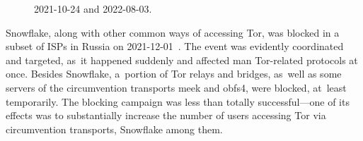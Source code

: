 \documentclass[letterpaper,twocolumn]{article}
\begin{document}
\begin{figure}
{\begin{minipage}[b][\textheight][b]{\linewidth}
{%
\mbox{2021-10-24} and \mbox{2022-08-03}.
\label{fig:client-counts-tm}
}
\end{minipage}}
\end{figure}


Snowflake, along with other common ways of accessing Tor,
was blocked in a subset of ISPs in Russia
on \mbox{2021-12-01}~\cite{ooni-2021-russia-blocks-tor}.
The event was evidently coordinated and targeted,
as~it happened suddenly and affected man Tor-related protocols at once.
Besides Snowflake,
a~portion of Tor relays and bridges,
as~well as some servers of
the circumvention transports meek and obfs4,
were blocked, at~least temporarily.
The blocking campaign was
less than totally successful---one
of its effects was to substantially increase the number
of users accessing Tor via circumvention transports,
Snowflake among them.
\end{document}
